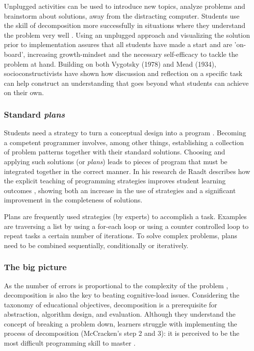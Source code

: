 Unplugged activities can be used to introduce new topics, analyze problems
and brainstorm about solutions, away from the distracting computer. Students
use the skill of decomposition more successfully in situations where they
understand the problem very well \cite{selby2015}. Using an unplugged
approach and visualizing the solution prior to implementation assures that
all students have made a start and are 'on-board', increasing growth-mindset
\cite{Cutts2010} and the necessary self-efficacy to tackle the problem at
hand. Building on both Vygotsky (1978) and Mead (1934), socioconstructivists
have shown how discussion and reflection on a specific task can help
construct an understanding that goes beyond what students can achieve on
their own.




\subsubsection{Standard \emph{plans}}

Students need a strategy to turn a conceptual design into a program
\cite{robins2003learning}\cite{spohrer1986novice}. Becoming a competent
programmer involves, among other things, establishing a collection of problem
patterns together with their standard solutions\cite{robins2003learning}.
Choosing and applying such solutions (or \emph{plans}) leads to pieces of
program that must be integrated together in the correct manner. In his
research de Raadt \cite{deRaadt2007}\cite{deRaadt2008} describes how the
explicit teaching of programming strategies improves student learning
outcomes \cite{deRaadt2006}, showing both an increase in the use of
strategies and a significant improvement in the completeness of solutions.


Plans are frequently used strategies (by experts) to accomplish a task.
Examples are traversing a list by using a for-each loop or using a counter
controlled loop to repeat tasks a certain number of iterations. To solve
complex problems, plans need to be combined sequentially, conditionally or
iteratively.


\subsubsection{The big picture}

As the  number of errors is proportional to the complexity of the problem
\cite{spohrer1986novice}, decomposition is also the key to beating
cognitive-load issues. Considering the taxonomy of educational objectives,
decomposition is a prerequisite for abstraction, algorithm design, and
evaluation\cite{selby2015}. Although they understand the concept of breaking
a problem down, learners struggle with implementing the process of
decomposition (McCracken's step 2 and 3): it is perceived to be the most
difficult programming skill to master \cite{selby2015}.

